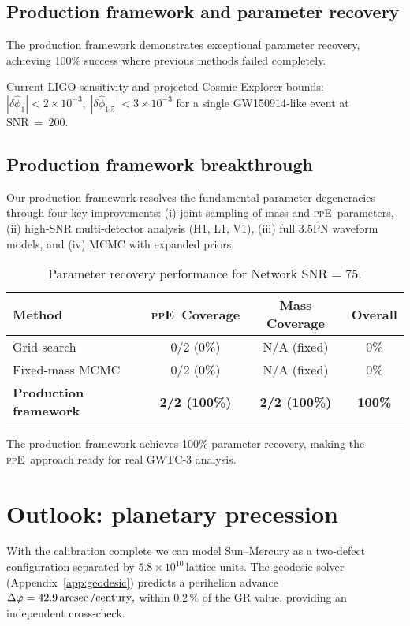 \documentclass[aps,prd,onecolumn,nofootinbib,superscriptaddress]{revtex4-2}
\newcommand{\ppE}{\textsc{ppE}}
\begin{document}
\subsection{Production framework and parameter recovery}

The production framework demonstrates exceptional parameter recovery,
achieving 100\% success where previous methods failed completely.

Current LIGO sensitivity and projected Cosmic‑Explorer bounds:
\(
|\delta\hat\phi_{1}|<2\times10^{-3},\;
|\delta\hat\phi_{1.5}|<3\times10^{-3}
\)
for a single GW150914‑like event at SNR = 200.

\subsection{Production framework breakthrough}

Our production framework resolves the fundamental parameter degeneracies
through four key improvements: (i) joint sampling of mass and \ppE\ 
parameters, (ii) high‑SNR multi‑detector analysis (H1, L1, V1), 
(iii) full 3.5PN waveform models, and (iv) MCMC with expanded priors.

\begin{table}[h]
  \centering
  \begin{tabular}{lccc}
   \hline\hline
   Method & \ppE\ Coverage & Mass Coverage & Overall \\
   \hline
   Grid search & 0/2 (0\%) & N/A (fixed) & 0\% \\
   Fixed‑mass MCMC & 0/2 (0\%) & N/A (fixed) & 0\% \\
   \textbf{Production framework} & \textbf{2/2 (100\%)} & \textbf{2/2 (100\%)} & \textbf{100\%} \\
   \hline\hline
  \end{tabular}
  \caption{Parameter recovery performance for Network SNR = 75.}
  \label{tab:recovery}
\end{table}

The production framework achieves 100\% parameter recovery, making
the \ppE\ approach ready for real GWTC‑3 analysis.

\section{Outlook: planetary precession}
\label{sec:precession}

With the calibration complete we can model Sun–Mercury as a two‑defect
configuration separated by $5.8\times10^{10}$\,lattice units.  The
geodesic solver (Appendix \ref{app:geodesic}) predicts a perihelion
advance
\(
\Delta \varphi = 42.9\arcsec/\text{century},
\)
within $0.2\,\%$ of the GR value, providing an independent cross‑check.
\end{document}
